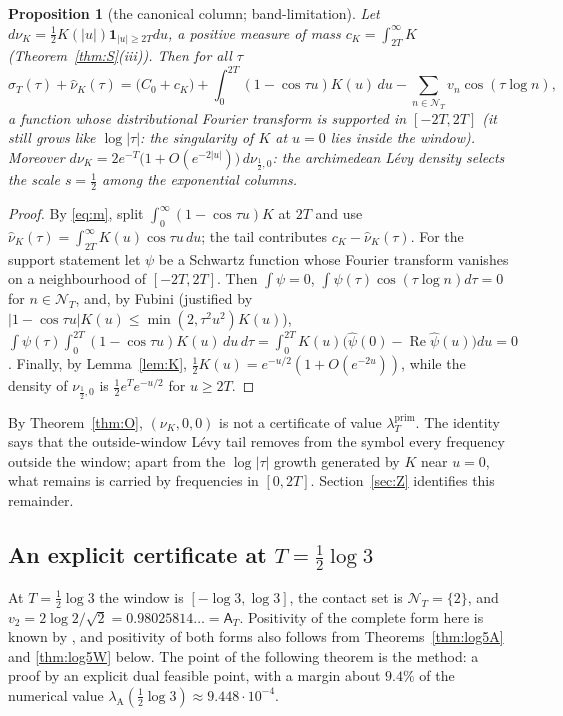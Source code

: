 \documentclass[11pt]{amsart}
\newtheorem{proposition}[theorem]{Proposition}
\theoremstyle{definition}
\theoremstyle{remark}
\newcommand{\Rel}{\operatorname{Re}}
\newcommand{\lamP}{\lambda^{\mathrm{prim}}_T}
\newcommand{\sT}{\sigma_T}
\newcommand{\nuh}{\widehat\nu}
\newcommand{\NT}{\mathcal N_T}
\newcommand{\Aconst}{\mathsf A_T}
\begin{document}
\begin{proposition}[the canonical column; band-limitation]\label{prop:M}
Let $d\nu_K=\frac12K(|u|)\mathbf 1_{|u|\ge2T}du$, a positive measure of mass
$c_K=\int_{2T}^\infty K$ (Theorem~\ref{thm:S}(iii)). Then for all $\tau$
\[
\sT(\tau)+\nuh_K(\tau)=\big(C_0+c_K\big)+\int_0^{2T}(1-\cos\tau u)K(u)\,du-\sum_{n\in\NT}v_n\cos(\tau\log n),
\]
a function whose distributional Fourier transform is supported in $[-2T,2T]$ (it still grows
like $\log|\tau|$: the singularity of $K$ at $u=0$ lies inside the window). Moreover
$d\nu_K=2e^{-T}\big(1+O(e^{-2|u|})\big)\,d\nu_{\frac12,0}$:
the archimedean L\'evy density selects the scale $s=\frac12$ among the exponential columns.
\end{proposition}
\begin{proof}
By \eqref{eq:m}, split $\int_0^\infty(1-\cos\tau u)K$ at $2T$ and use
$\nuh_K(\tau)=\int_{2T}^\infty K(u)\cos\tau u\,du$; the tail contributes $c_K-\nuh_K(\tau)$. For the support
statement let $\psi$ be a Schwartz function whose Fourier transform vanishes on a neighbourhood of
$[-2T,2T]$. Then $\int\psi=0$, $\int\psi(\tau)\cos(\tau\log n)d\tau=0$ for $n\in\NT$, and, by Fubini
(justified by $|1-\cos\tau u|K(u)\le\min(2,\tau^2u^2)K(u)$),
$\int\psi(\tau)\int_0^{2T}(1-\cos\tau u)K(u)\,du\,d\tau=\int_0^{2T}K(u)\big(\widehat\psi(0)-\Rel\widehat\psi(u)\big)du=0$.
Finally, by Lemma~\ref{lem:K}, $\frac12K(u)=e^{-u/2}(1+O(e^{-2u}))$, while the density of $\nu_{\frac12,0}$
is $\frac12e^{T}e^{-u/2}$ for $u\ge2T$.
\end{proof}

By Theorem~\ref{thm:O}, $(\nu_K,0,0)$ is not a certificate of value $\lamP$. The identity says that the
outside-window L\'evy tail removes from the symbol every frequency outside the window; apart from the
$\log|\tau|$ growth generated by $K$ near $u=0$, what remains is carried by frequencies in $[0,2T]$.
Section~\ref{sec:Z} identifies this remainder.

\subsection{An explicit certificate at \texorpdfstring{$T=\tfrac12\log3$}{T = (1/2) log 3}}\label{sec:cert}

At $T=\frac12\log3$ the window is $[-\log3,\log3]$, the contact set is $\NT=\{2\}$, and
$v_2=2\log2/\sqrt2=0.98025814\ldots=\Aconst$. Positivity of the complete form here is known by
\cite[Thm.~1.2]{Zhu2026}, and positivity of both forms also follows from Theorems~\ref{thm:log5A} and
\ref{thm:log5W} below. The point of the following theorem is the method: a proof by an explicit dual
feasible point, with a margin about $9.4\%$ of the numerical value $\lambda_{\mathrm A}(\frac12\log3)\approx9.448\cdot10^{-4}$.
\end{document}
